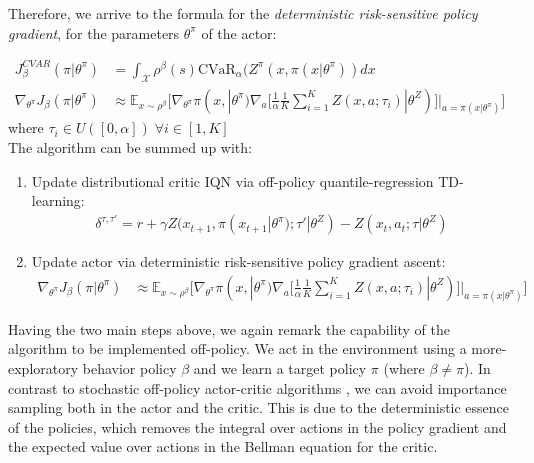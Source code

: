 Therefore, we arrive to the formula for the \textit{deterministic risk-sensitive policy gradient},
for the parameters $\theta^\pi$ of the actor: 

\begin{align}
    J_\beta^{CVAR}(\pi | \theta^\pi) &= \int_\mathcal{X} \rho^\beta(s)\text{CVaR}_\alpha(Z^\pi(x,\pi (x| \theta^\pi))dx \nonumber\\
    \nabla_{\theta^\pi} J_\beta(\pi | \theta^\pi) &\approx \mathbb E_{x \sim \rho^\beta} 
    \big [\nabla_{\theta^\pi} \pi(x,| \theta^\pi) \nabla_a  [\frac{1}{\alpha} \frac{1}{K}
    \sum_{i=1}^K Z(x,a; \tau_i) | \theta^Z)]|_{a=\pi(x| \theta^\pi)}  \big]
    \label{eq:actor_grad}
\end{align}
where $\tau_i \in U([0,\alpha]) \; \forall i \in [1,K]$\\


The algorithm can be summed up with:

\begin{enumerate}
    \item Update distributional critic IQN via off-policy quantile-regression TD-learning:
    \begin{align}
        \delta^{\tau, \tau'} = r + \gamma Z(x_{t+1},\pi(x_{t+1}|\theta^\pi);\tau'| \theta^Z)-Z(x_t,a_t;\tau|\theta^Z) \nonumber
    \end{align}
    \item Update actor via deterministic risk-sensitive policy gradient ascent:
    \begin{align}
        \nabla_{\theta^\pi} J_\beta(\pi | \theta^\pi) &\approx \mathbb E_{x \sim \rho^\beta} 
    \big [\nabla_{\theta^\pi} \pi(x,| \theta^\pi) \nabla_a  [\frac{1}{\alpha} \frac{1}{K}
    \sum_{i=1}^K Z(x,a; \tau_i) | \theta^Z)]|_{a=\pi(x| \theta^\pi)}  \big] \nonumber
    \end{align}
\end{enumerate}

Having the two main steps above, we again remark the capability of the algorithm to be
implemented off-policy. We act in the environment using 
a more-exploratory behavior policy $\beta$ and we learn a
target policy $\pi$ (where $\beta \neq \pi$).
In contrast to stochastic off-policy actor-critic algorithms \citep{Degris2012}, we can avoid
importance sampling both in the actor and the critic.
This is due to the deterministic essence of the policies, which removes the integral over actions
in the policy gradient and the expected value over actions in the Bellman equation for the critic.
